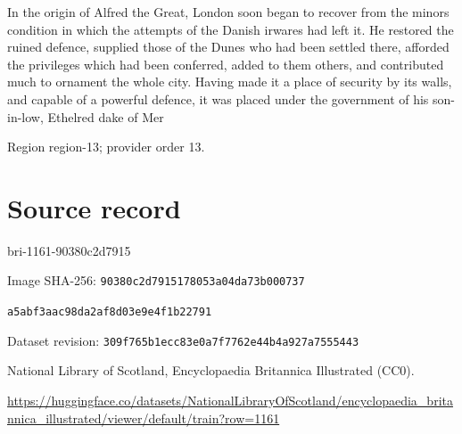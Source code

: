 \documentclass[11pt]{article}
\begin{document}
In the origin of Alfred the Great, London soon began to recover from the minors condition in which the attempts of the Danish irwares had left it. He restored the ruined defence, supplied those of the Dunes who had been settled there, afforded the privileges which had been conferred, added to them others, and contributed much to ornament the whole city. Having made it a place of security by its walls, and capable of a powerful defence, it was placed under the government of his son-in-low, Ethelred dake of Mer
\par

{\scriptsize\color{gray} Region region-13; provider order 13.\par}
\medskip
\newpage\section*{Source record}
bri-1161-90380c2d7915\par
Image SHA-256: \texttt{90380c2d7915178053a04da73b000737}\par\texttt{a5abf3aac98da2af8d03e9e4f1b22791}\par
Dataset revision: \texttt{309f765b1ecc83e0a7f7}\texttt{762e44b4a927a7555443}\par
National Library of Scotland, Encyclopaedia Britannica Illustrated (CC0).\par
\url{https://huggingface.co/datasets/NationalLibraryOfScotland/encyclopaedia_britannica_illustrated/viewer/default/train?row=1161}
\end{document}
